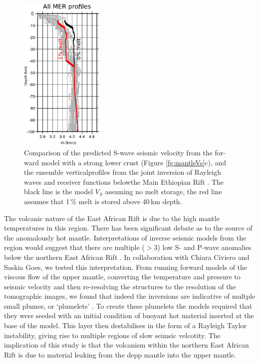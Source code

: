 \begin{figure}
\centering
\includegraphics[width=4cm]{./figures/ch2-MER-Vs.pdf}
\caption{Comparison of the predicted S-wave seismic velocity from the for-ward model with a strong lower crust (Figure \ref{fg:mantleVs}c), and the ensemble verticalprofiles from the joint inversion of Rayleigh waves and receiver functions belowthe Main Ethiopian Rift \citep{keranen-etal-2009}. The black line is the model $V_{S}$ assuming no melt storage, the red line assumes that 1\,\% melt is stored above 40\,km depth.}
\label{fg:MER-Vs}
\end{figure}

The volcanic nature of the East African Rift is due to the high mantle temperatures in this region. There has been significant debate as to the source of the anomalously hot mantle. Interpretations of inverse seismic models from the region would suggest that there are multiple ($>3$) low S- and P-wave anomalies below the northern East African Rift \citep[e.g.]{chang-vanderlee-2011,hammond-etal-203,emry-etal-2019}. In collaboration with Chiara Civiero and Saskia Goes, we tested this interpretation. From running forward models of the viscous flow of the upper mantle, converting the temperature and pressure to seismic velocity and then re-resolving the structures to the resolution of the tomographic images, we found that indeed the inversions are indicative of multple small plumes, or `plumelets' \citep{civiero-etal-2019}. To create these plumelets the models required that they were seeded with an initial condition of buoyant hot  material inserted at the base of the model. This layer then destabilises in the form of a Rayleigh Taylor instability, giving rise to multiple regions of slow seimsic velcotity. The implication of this study is that the volcanism within the northern East African Rift is due to material leaking from the depp mantle into the upper mantle. 

